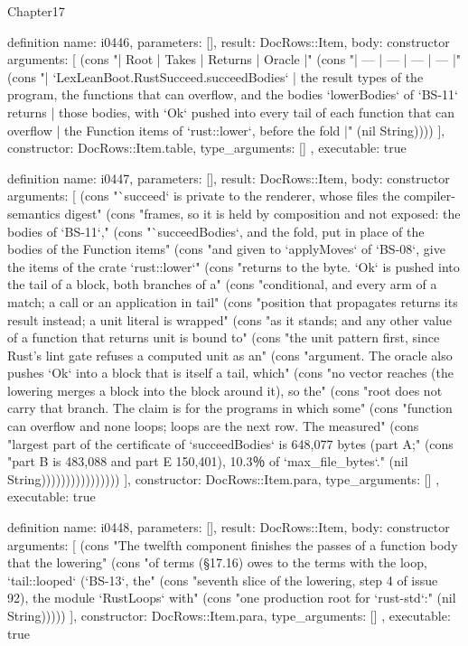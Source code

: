 \begin{lexlean}{Chapter17}
\begin{semanticmodule}
definition{
  name: i0446,
  parameters: [],
  result: DocRows::Item,
  body: constructor{
    arguments: [
      (cons "| Root | Takes | Returns | Oracle |" (cons "| --- | --- | --- | --- |" (cons "| `LexLeanBoot.RustSucceed.succeedBodies` | the result types of the program, the functions that can overflow, and the bodies `lowerBodies` of `BS-11` returns | those bodies, with `Ok` pushed into every tail of each function that can overflow | the Function items of `rust::lower`, before the fold |" (nil String))))
    ],
    constructor: DocRows::Item.table,
    type_arguments: []
  },
  executable: true
}

definition{
  name: i0447,
  parameters: [],
  result: DocRows::Item,
  body: constructor{
    arguments: [
      (cons "`succeed` is private to the renderer, whose files the compiler-semantics digest" (cons "frames, so it is held by composition and not exposed: the bodies of `BS-11`," (cons "`succeedBodies`, and the fold, put in place of the bodies of the Function items" (cons "and given to `applyMoves` of `BS-08`, give the items of the crate `rust::lower`" (cons "returns to the byte. `Ok` is pushed into the tail of a block, both branches of a" (cons "conditional, and every arm of a match; a call or an application in tail" (cons "position that propagates returns its result instead; a unit literal is wrapped" (cons "as it stands; and any other value of a function that returns unit is bound to" (cons "the unit pattern first, since Rust's lint gate refuses a computed unit as an" (cons "argument. The oracle also pushes `Ok` into a block that is itself a tail, which" (cons "no vector reaches (the lowering merges a block into the block around it), so the" (cons "root does not carry that branch. The claim is for the programs in which some" (cons "function can overflow and none loops; loops are the next row. The measured" (cons "largest part of the certificate of `succeedBodies` is 648,077 bytes (part A;" (cons "part B is 483,088 and part E 150,401), 10.3％ of `max_file_bytes`." (nil String))))))))))))))))
    ],
    constructor: DocRows::Item.para,
    type_arguments: []
  },
  executable: true
}

definition{
  name: i0448,
  parameters: [],
  result: DocRows::Item,
  body: constructor{
    arguments: [
      (cons "The twelfth component finishes the passes of a function body that the lowering" (cons "of terms (§17.16) owes to the terms with the loop, `tail::looped` (`BS-13`, the" (cons "seventh slice of the lowering, step 4 of issue 92), the module `RustLoops` with" (cons "one production root for `rust-std`:" (nil String)))))
    ],
    constructor: DocRows::Item.para,
    type_arguments: []
  },
  executable: true
}


\end{semanticmodule}
\end{lexlean}
